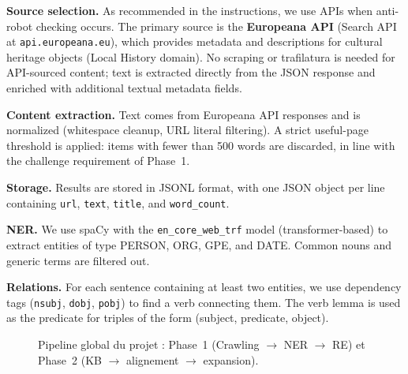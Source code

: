 \documentclass[11pt,a4paper]{article}
\begin{document}
  \textbf{Source selection.} As recommended in the instructions, we use APIs when anti-robot checking occurs. The primary source is the \textbf{Europeana API} (Search API at \texttt{api.europeana.eu}), which provides metadata and descriptions for cultural heritage objects (Local History domain). No scraping or trafilatura is needed for API-sourced content; text is extracted directly from the JSON response and enriched with additional textual metadata fields.

  \textbf{Content extraction.} Text comes from Europeana API responses and is normalized (whitespace cleanup, URL literal filtering). A strict useful-page threshold is applied: items with fewer than 500 words are discarded, in line with the challenge requirement of Phase~1.

  \textbf{Storage.} Results are stored in JSONL format, with one JSON object per line containing \texttt{url}, \texttt{text}, \texttt{title}, and \texttt{word\_count}.

  \textbf{NER.} We use spaCy with the \texttt{en\_core\_web\_trf} model (transformer-based) to extract entities of type PERSON, ORG, GPE, and DATE. Common nouns and generic terms are filtered out.

  \textbf{Relations.} For each sentence containing at least two entities, we use dependency tags (\texttt{nsubj}, \texttt{dobj}, \texttt{pobj}) to find a verb connecting them. The verb lemma is used as the predicate for triples of the form (subject, predicate, object).

  \begin{figure}[ht]
  \centering
  \caption{Pipeline global du projet : Phase~1 (Crawling $\rightarrow$ NER $\rightarrow$ RE) et Phase~2 (KB $\rightarrow$ alignement $\rightarrow$ expansion).}
  \end{figure}
\end{document}

